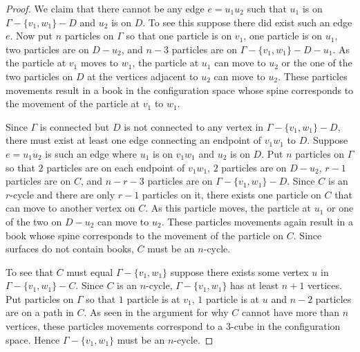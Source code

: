 \begin{proof}
We claim that there cannot be any edge \(e = u_1 u_2\) such that \(u_1\) is on \(\Gamma - \{v_1, w_1\} - D\) and \(u_2\) is on \(D\).
To see this suppose there did exist such an edge \(e\).
Now put \(n\) particles on \(\Gamma\) so that 
one particle is on \(v_1\), one particle is on \(u_1\), two particles are on \(D - u_2\), 
and \(n - 3\) particles are on \(\Gamma - \{v_1, w_1\} - D - u_1\).
As the particle at \(v_1\) moves to \(w_1\), the particle at \(u_1\) can move to \(u_2\) or 
the one of the two particles on \(D\) at the vertices adjacent to \(u_2\) can move to \(u_2\).
These particles movements result in a book in the configuration space whose spine corresponds to the movement of the particle at \(v_1\) to \(w_1\).

Since \(\Gamma\) is connected but \(D\) is not connected to any vertex in \(\Gamma - \{v_1, w_1\} - D\),
there must exist at least one edge connecting an endpoint of \(v_1 w_1\) to \(D\).
Suppose \(e = u_1 u_2\) is such an edge where \(u_1\) is on \(v_1 w_1\) and \(u_2\) is on \(D\).
Put \(n\) particles on \(\Gamma\) so that \(2\) particles are on each endpoint of \(v_1 w_1\), 
\(2\) particles are on \(D - u_2\), 
\(r - 1\) particles are on \(C\), and \(n - r - 3\) particles are on \(\Gamma - \{v_1, w_1\} - D\).
Since \(C\) is an \(r\)-cycle and there are only \(r - 1\) particles on it, 
there exists one particle on \(C\) that can move to another vertex on \(C\).
As this particle moves, the particle at \(u_1\) or one of the two on \(D - u_2\) can move to \(u_2\).
These particles movements again result in a book whose spine corresponds to the movement of the particle on \(C\).
Since surfaces do not contain books, \(C\) must be an \(n\)-cycle.

To see that \(C\) must equal \(\Gamma - \{v_1, w_1\}\) suppose there exists some vertex \(u\) in \(\Gamma - \{v_1, w_1\} - C\).
Since \(C\) is an \(n\)-cycle, \(\Gamma - \{v_1, w_1\}\) has at least \(n + 1\) vertices.
Put particles on \(\Gamma\) so that \(1\) particle is at \(v_1\), \(1\) particle is at \(u\) and \(n-2\) particles are on a path in \(C\).
As seen in the argument for why \(C\) cannot have more than \(n\) vertices, these particles movements correspond to a \(3\)-cube in the configuration
space. Hence \(\Gamma - \{v_1, w_1\}\) must be an \(n\)-cycle.
\end{proof}


